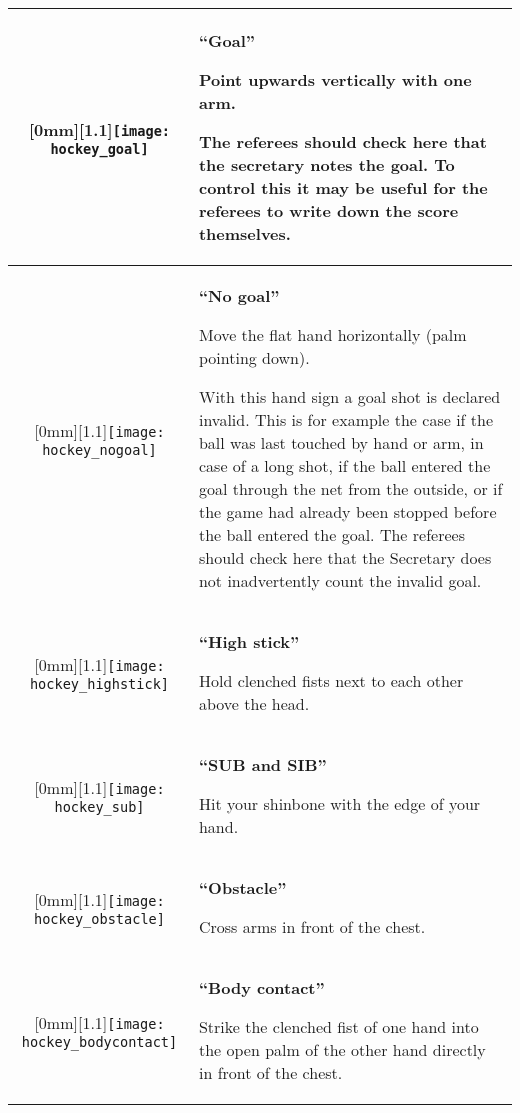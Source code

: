 \begin{longtable}{|c|p{10.8cm}|}
\raisebox{-\height}[0mm][1.1\height]{\texttt{[image: hockey\_goal]}}
&
\textbf{``Goal''}

Point upwards vertically with one arm.

The referees should check here that the secretary notes the goal.
To control this it may be useful for the referees to write down the score themselves.\\

\hline %

\raisebox{-\height}[0mm][1.1\height]{\texttt{[image: hockey\_nogoal]}}
&
\textbf{``No goal''}

Move the flat hand horizontally (palm pointing down).

With this hand sign a goal shot is declared invalid.
This is for example the case if the ball was last touched by hand or arm, in case of a long shot, if the ball entered the goal through the net from the outside, or if the game had already been stopped before the ball entered the goal.
The referees should check here that the Secretary does not inadvertently count the invalid goal.\\

\hline %

\raisebox{-\height}[0mm][1.1\height]{\texttt{[image: hockey\_highstick]}}
&
\textbf{``High stick''}

Hold clenched fists next to each other above the head.\\

\hline %

\raisebox{-\height}[0mm][1.1\height]{\texttt{[image: hockey\_sub]}}
  &
\textbf{``SUB and SIB''}

Hit your shinbone with the edge of your hand.\\

\hline %

\raisebox{-\height}[0mm][1.1\height]{\texttt{[image: hockey\_obstacle]}}
  &
\textbf{``Obstacle''}

Cross arms in front of the chest.\\

\hline %

\raisebox{-\height}[0mm][1.1\height]{\texttt{[image: hockey\_bodycontact]}}
  &
\textbf{``Body contact''}

Strike the clenched fist of one hand into the open palm of the other hand directly in front of the chest.\\


\end{longtable}

